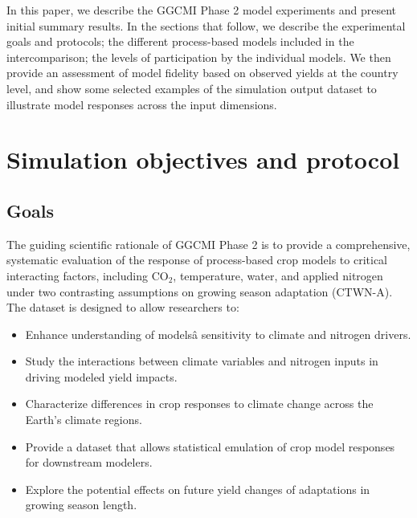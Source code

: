 \documentclass[gmd, manuscript]{copernicus} %
\begin{document}
In this paper, we describe the GGCMI Phase 2 model experiments and present initial summary results.
In the sections that follow, we describe the experimental goals and protocols; the different process-based models included in the intercomparison; the levels of participation by the individual models. We then provide an assessment of model fidelity based on observed yields at the country level, and show some selected examples of the simulation output dataset to illustrate model responses across the input dimensions.

\section{Simulation objectives and protocol}
\label{S:2}
\subsection{Goals}

The guiding scientific rationale of GGCMI Phase 2 is to provide a comprehensive, systematic evaluation of the response of process-based crop models to critical interacting factors, including CO$_2$, temperature, water, and applied nitrogen under two contrasting assumptions on growing season adaptation (CTWN-A). 
The dataset is designed to allow researchers to:
\begin{itemize}
    \item Enhance understanding of modelsâ sensitivity to climate and nitrogen drivers.
    \item Study the interactions between climate variables and nitrogen inputs in driving modeled yield impacts. 
    \item Characterize differences in crop responses to climate change across the Earth's climate regions.
    \item Provide a dataset that allows statistical emulation of crop model responses for downstream modelers.
    \item Explore the potential effects on future yield changes of adaptations in growing season length.
\end{itemize}
\vspace{-0.05in}
\end{document}
